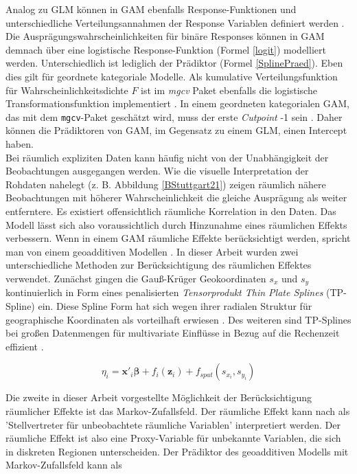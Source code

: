 \documentclass{Vorlage}
\begin{document}
Analog zu GLM können in GAM ebenfalls Response-Funktionen und unterschiedliche Verteilungsannahmen der Response Variablen definiert werden \cite[p. 448]{fahrmeir2013regression}. Die Ausprägungswahrscheinlichkeiten für binäre Responses können in GAM demnach über eine logistische Response-Funktion (Formel \ref{logit}) modelliert werden. Unterschiedlich ist lediglich der Prädiktor (Formel \ref{SplinePraed}). Eben dies gilt für geordnete kategoriale Modelle. Als kumulative Verteilungsfunktion für Wahrscheinlichkeitsdichte $F$ ist im \textit{mgcv} Paket ebenfalls die logistische Transformationsfunktion implementiert \cite[p. 22]{wood2016}. In einem geordneten kategorialen GAM, das mit dem \texttt{mgcv}-Paket geschätzt wird, muss der erste \textit{Cutpoint} -1 sein \cite[p. 22]{wood2016}. Daher können die Prädiktoren von GAM, im Gegensatz zu einem GLM, einen Intercept haben.\\
Bei räumlich expliziten Daten kann häufig nicht von der Unabhängigkeit der Beobachtungen ausgegangen werden. Wie die visuelle Interpretation der Rohdaten nahelegt (z. B. Abbildung \ref{BStuttgart21}) zeigen räumlich nähere Beobachtungen mit höherer Wahrscheinlichkeit die gleiche Ausprägung als weiter entferntere. Es existiert offensichtlich räumliche Korrelation in den Daten. Das Modell lässt sich also voraussichtlich durch Hinzunahme eines räumlichen Effekts verbessern. Wenn in einem GAM räumliche Effekte berücksichtigt werden, spricht man von einem geoadditiven Modellen \cite[p. 540]{fahrmeir2013regression}. In dieser Arbeit wurden zwei unterschiedliche Methoden zur Berücksichtigung des räumlichen Effektes verwendet. Zunächst gingen die Gauß-Krüger Geokoordinaten $s_x$ und $s_y$ kontinuierlich in Form eines penalisierten \textit{Tensorprodukt Thin Plate Splines} (TP-Spline) ein. Diese Spline Form hat sich wegen ihrer radialen Struktur für geographische Koordinaten als vorteilhaft erwiesen \cite[p. 354]{gu1993}. Des weiteren sind TP-Splines bei großen Datenmengen für multivariate Einflüsse in Bezug auf die Rechenzeit effizient \cite[p. 95 f.]{wood2003}.

\begin{equation}
\eta_{i} =\mathbf{x}'_i \boldsymbol{\beta}+f_{i}(\mathbf{z}_{i})+f_{spat}(s_{x_i},s_{y_i})
\end{equation}

Die zweite in dieser Arbeit vorgestellte Möglichkeit der Berücksichtigung räumlicher Effekte ist das Markov-Zufallsfeld. Der räumliche Effekt kann nach \cite[p. 541]{fahrmeir2013regression} als 'Stellvertreter für unbeobachtete räumliche Variablen' interpretiert werden. Der räumliche Effekt ist also eine Proxy-Variable für unbekannte Variablen, die sich in diskreten Regionen unterscheiden. Der Prädiktor des geoadditiven Modells mit Markov-Zufallsfeld kann als
\end{document}
